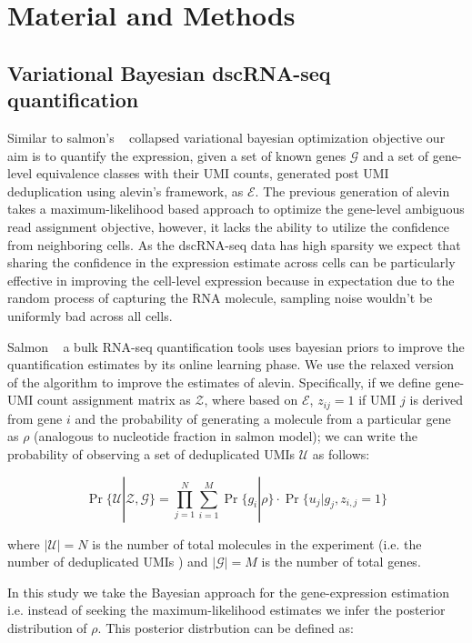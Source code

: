 \section{Material and Methods}
\label{sec:alv2_methods}

\subsection{Variational Bayesian dscRNA-seq quantification}
Similar to salmon's ~\citep{salmon} collapsed variational bayesian optimization 
objective our aim is to quantify the expression, given a set of known genes $\mathcal{G}$ and a set
of gene-level equivalence classes with their UMI counts, generated post UMI deduplication using alevin's 
framework, as $\mathcal{E}$. The previous generation of alevin takes a maximum-likelihood based approach to 
optimize the gene-level ambiguous read assignment objective, however, it lacks the ability to utilize the 
confidence from neighboring cells. As the dscRNA-seq data has high sparsity we expect that sharing
the confidence in the expression estimate across cells can be particularly effective in improving the
cell-level expression because in expectation due to the random process of capturing the RNA molecule,
sampling noise wouldn't be uniformly bad across all cells.

Salmon ~\citep{salmon} a bulk RNA-seq quantification tools uses bayesian priors to improve the 
quantification estimates by its online learning phase. We use the relaxed version of the algorithm 
to improve the estimates of alevin. Specifically, if we define gene-UMI count 
assignment matrix as $\mathcal{Z}$, where based on $\mathcal{E}$, $z_{ij}=1$ if UMI $j$ is derived from 
gene $i$ and the probability of generating a molecule from a particular gene as $\rho$ (analogous to 
nucleotide fraction in salmon model); we can write the probability of observing a set of deduplicated 
UMIs $\mathcal{U}$ as follows:

\begin{equation}
	\Pr\{\mathcal{U} | \mathcal{Z},\mathcal{G}\} = 
	\prod_{j=1}^{N}\sum_{i=1}^{M}\Pr\{ g_i | \rho \} \cdot \Pr\{ u_j | g_j, z_{i,j} = 1 \}
\end{equation}
 
 where $|\mathcal{U}| = N$ is the number of total molecules in the experiment (i.e. the number of 
 deduplicated UMIs ) and $|\mathcal{G}| = M$ is the number of total genes.
 
 In this study we take the Bayesian approach for the gene-expression estimation i.e. instead of 
 seeking the maximum-likelihood estimates we infer the posterior distribution of $\rho$. 
 This posterior distrbution can be defined as:

